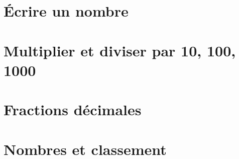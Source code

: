 \documentclass[12pt,a4paper]{article}
\date{}
\title{}
\begin{document}




\section{\'Ecrire un nombre}\label{sec:ecrire-un-nombre}




\section{Multiplier et diviser par 10, 100, 1000}




\section{Fractions décimales}



\section{Nombres et classement}


\end{document}
